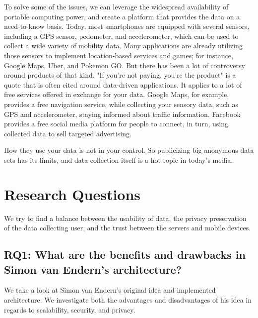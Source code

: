 To solve some of the issues, we can leverage the widespread availability of portable computing power, and create a platform that provides the data on a need-to-know basis. Today, most smartphones are equipped with several sensors, including a GPS sensor, pedometer, and accelerometer, which can be used to collect a wide variety of mobility data. Many applications are already utilizing those sensors to implement location-based services and games; for instance, Google Maps, Uber, and Pokemon GO. But there has been a lot of controversy around products of that kind. "If you're not paying, you're the product" is a quote that is often cited around data-driven applications.
It applies to a lot of free services offered in exchange for your data. Google Maps, for example, provides a free navigation service, while collecting your sensory data, such as GPS and accelerometer, staying informed about traffic information. Facebook provides a free social media platform for people to connect, in turn, using collected data to sell targeted advertising.

How they use your data is not in your control. So publicizing big anonymous data sets has its limits, and data collection itself is a hot topic in today's media. 

\section{Research Questions}
We try to find a balance between the usability of data, the privacy preservation of the data collecting user, and the trust between the servers and mobile devices.
\subsection*{RQ1: What are the benefits and drawbacks in Simon van Endern's architecture?}
We take a look at Simon van Endern's original idea and implemented architecture. We investigate both the advantages and disadvantages of his idea in regards to scalability, security, and privacy.
